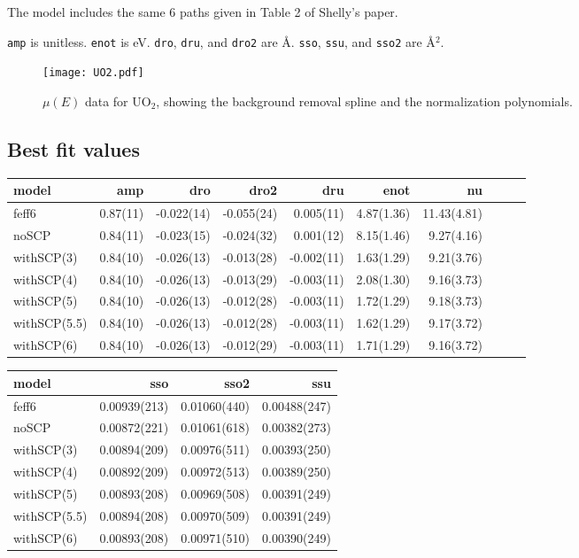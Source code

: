 \documentclass[11pt]{article}
\begin{document}
The model includes the same 6 paths given in Table 2 of Shelly's
paper.

\texttt{amp} is unitless. \texttt{enot} is eV. \texttt{dro},
\texttt{dru}, and \texttt{dro2} are {\AA}. \texttt{sso}, \texttt{ssu},
and \texttt{sso2} are \AA$^2$.

\begin{figure}[h]
  \centering
  \texttt{[image: UO2.pdf]} 
  \caption{$\mu(E)$ data for UO$_2$, showing the background
    removal spline and the normalization polynomials.}
  \label{fig:uo2-data}
\end{figure}


\subsection{Best fit values}
\label{sec:orgheadline20}

\begin{center}
  \footnotesize
  \begin{tabular}{lrrrrrrrrr}
    model & amp & dro & dro2 & dru & enot & nu \\
    \hline
    feff6        & 0.87(11) & -0.022(14) & -0.055(24) &  0.005(11) & 4.87(1.36) & 11.43(4.81) \\
    noSCP        & 0.84(11) & -0.023(15) & -0.024(32) &  0.001(12) & 8.15(1.46) &  9.27(4.16) \\
    withSCP(3)   & 0.84(10) & -0.026(13) & -0.013(28) & -0.002(11) & 1.63(1.29) &  9.21(3.76) \\
    withSCP(4)   & 0.84(10) & -0.026(13) & -0.013(29) & -0.003(11) & 2.08(1.30) &  9.16(3.73) \\
    withSCP(5)   & 0.84(10) & -0.026(13) & -0.012(28) & -0.003(11) & 1.72(1.29) &  9.18(3.73) \\
    withSCP(5.5) & 0.84(10) & -0.026(13) & -0.012(28) & -0.003(11) & 1.62(1.29) &  9.17(3.72) \\
    withSCP(6)   & 0.84(10) & -0.026(13) & -0.012(29) & -0.003(11) & 1.71(1.29) &  9.16(3.72) \\
  \end{tabular}

  \begin{tabular}{lrrr}
    model & sso & sso2 & ssu\\
    \hline
    feff6        & 0.00939(213) & 0.01060(440) & 0.00488(247)\\
    noSCP        & 0.00872(221) & 0.01061(618) & 0.00382(273)\\
    withSCP(3)   & 0.00894(209) & 0.00976(511) & 0.00393(250)\\
    withSCP(4)   & 0.00892(209) & 0.00972(513) & 0.00389(250)\\
    withSCP(5)   & 0.00893(208) & 0.00969(508) & 0.00391(249)\\
    withSCP(5.5) & 0.00894(208) & 0.00970(509) & 0.00391(249)\\
    withSCP(6)   & 0.00893(208) & 0.00971(510) & 0.00390(249)\\
  \end{tabular}
\end{center}
\end{document}
